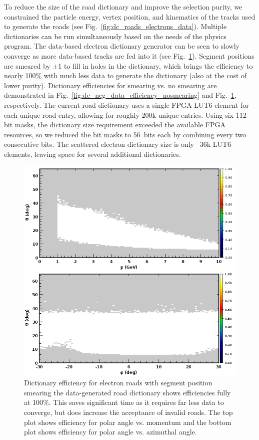 To reduce the size of the road dictionary and improve the selection purity, we constrained the particle energy,
vertex position, and kinematics of the tracks used to generate the roads (see
Fig.~\ref{fig:dc_roads_electrons_data}). Multiple dictionaries can be run simultaneously based on the needs of
the physics program. The data-based electron dictionary generator can be seen to slowly converge as more
data-based tracks are fed into it (see Fig.~\ref{fig:dc_neg_data_efficiency_smearing}). Segment positions
are smeared by $\pm$1 to fill in holes in the dictionary, which brings the efficiency to nearly 100\% with much
less data to generate the dictionary (also at the cost of lower purity). Dictionary efficiencies for smearing vs.
no smearing are demonstrated in Fig.~\ref{fig:dc_neg_data_efficiency_nosmearing} and
Fig.~\ref{fig:dc_neg_data_efficiency_smearing}, respectively. The current road dictionary uses a single FPGA
LUT6 element for each unique road entry, allowing for roughly 200k unique entries. Using six 112-bit masks, the
dictionary size requirement exceeded the available FPGA resources, so we reduced the bit masks to 56~bits
each by combining every two consecutive bits. The scattered electron dictionary size is only ~36k LUT6 elements,
leaving space for several additional dictionaries.

\begin{figure}[hbt]
	\centering
	\includegraphics[width=1.0\columnwidth,keepaspectratio]{img/dc_neg_data_efficiency_smearing.png}
	\caption{Dictionary efficiency for electron roads with segment position smearing the data-generated road
          dictionary shows efficiencies fully at 100\%. This saves significant time as it requires far less data to
          converge, but does increase the acceptance of invalid roads. The top plot shows efficiency for polar angle
          vs. momentum and the bottom plot shows efficiency for polar angle vs. azimuthal angle.}
	\label{fig:dc_neg_data_efficiency_smearing}
\end{figure}

